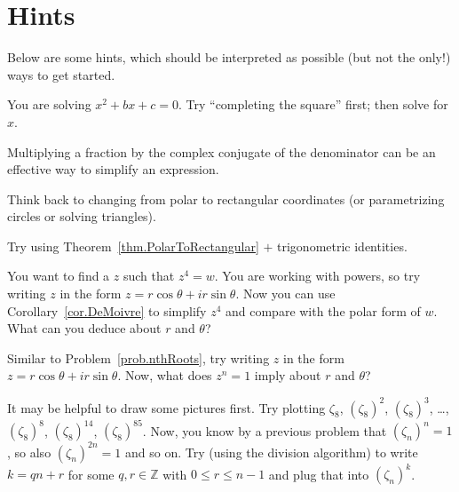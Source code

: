 \chapter{Hints}
\label{chapter:Hints}
\thispagestyle{empty}

Below are some hints, which should be interpreted as possible (but not the only!) ways to get started.

\begin{hint*}
You are solving $x^2+bx+c = 0$. Try ``completing the square'' first; then solve for $x$.
\end{hint*}

\begin{hint*}
Multiplying a fraction by the complex conjugate of the denominator can be an effective way to simplify an expression.
\end{hint*}

\begin{hint*}
Think back to changing from polar to rectangular coordinates (or parametrizing circles or solving triangles).
\end{hint*}

\begin{hint*}
Try using Theorem~\ref{thm.PolarToRectangular} $+$ trigonometric identities. 
\end{hint*}

\begin{hint*}
You want to find a $z$ such that $z^4 = w$. You are working with powers, so try writing $z$ in the form $z = r\cos\theta + ir\sin\theta$. Now you can use Corollary~\ref{cor.DeMoivre} to simplify $z^4$ and compare with the polar form of $w$. What can you deduce about $r$ and $\theta$?
\end{hint*}

\begin{hint*}
Similar to Problem~\ref{prob.nthRoots}, try writing $z$ in the form $z = r\cos\theta + ir\sin\theta$. Now, what does $z^n = 1$ imply about $r$ and $\theta$?
\end{hint*}

\begin{hint*}
It may be helpful to draw some pictures first. Try plotting $\zeta_8$, $(\zeta_8)^2$, $(\zeta_8)^3$, \ldots, $(\zeta_8)^8$, $(\zeta_8)^{14}$, $(\zeta_8)^{85}$. Now, you know by a previous problem that $(\zeta_n)^n = 1$, so also $(\zeta_n)^{2n} = 1$ and so on. Try (using the division algorithm) to write $k = qn +r$ for some $q,r\in \mathbb{Z}$ with $0\le r \le n-1$ and plug that into $(\zeta_n)^{k}$.
\end{hint*}


